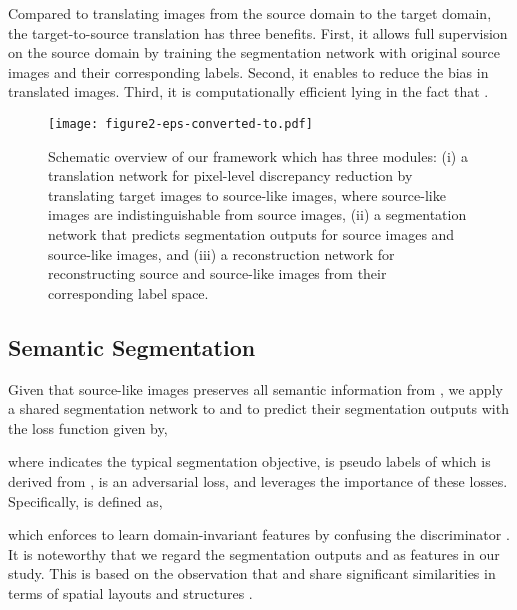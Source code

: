 \documentclass[runningheads]{llncs}
\begin{document}
	Compared to translating images from the source domain to the target domain, the target-to-source translation has three benefits. First, it allows full supervision on the source domain by training the segmentation network with original source images and their corresponding labels. Second, it enables to reduce the bias in translated images. Third, it is computationally efficient lying in the fact that .
	
	








	\begin{figure*}[t]
\begin{center}
\texttt{[image: figure2-eps-converted-to.pdf]}
		\end{center}
		\caption{Schematic overview of our framework which has three modules: (i) a translation network for pixel-level discrepancy reduction by translating target images to source-like images, where source-like images are indistinguishable from source images, (ii) a segmentation network that predicts segmentation outputs for source images and source-like images, and (iii) a reconstruction network for reconstructing source and source-like images from their corresponding label space.}
		\label{fig:framework}
\end{figure*}
	
	\subsection{Semantic Segmentation}
	
	Given that source-like images  preserves all semantic information from , we apply a shared segmentation network  to  and  to predict their segmentation outputs with the loss function given by,
	
	where  indicates the typical segmentation objective,  is pseudo labels of  which is derived from \cite{li2019bidirectional},  is an adversarial loss, and  leverages the importance of these losses. Specifically,  is defined as,
	
	which enforces  to learn domain-invariant features by confusing the discriminator . It is noteworthy that we regard the segmentation outputs  and  as features in our study. This is based on the observation that  and  share significant similarities in terms of spatial layouts and structures \cite{tsai2018learning}. 
	
\end{document}
